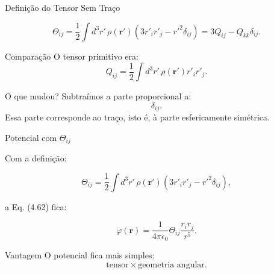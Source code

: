 \documentclass[aspectratio=169]{beamer}
\begin{document}
\begin{frame}{Definição do Tensor Sem Traço}

\begin{eqbox}
\begin{equation}
\Theta_{ij}
=
\frac12
\int d^3r'\,
\rho(\mathbf r')
\left(
3r'_i r'_j-r'^2\delta_{ij}
\right)
=
3Q_{ij}-Q_{kk}\delta_{ij}.
\tag{4.63}
\end{equation}
\end{eqbox}

\begin{mybox}{Comparação}
O tensor primitivo era:
\[
Q_{ij}
=
\frac12
\int d^3r'\,
\rho(\mathbf r')r'_i r'_j.
\]
\end{mybox}

\begin{alertblock}{O que mudou?}
Subtraímos a parte proporcional a:
\[
\delta_{ij}.
\]
Essa parte corresponde ao traço, isto é, à parte esfericamente simétrica.
\end{alertblock}

\end{frame}

\begin{frame}{Potencial com \(\Theta_{ij}\)}

Com a definição:

\[
\Theta_{ij}
=
\frac12
\int d^3r'\,
\rho(\mathbf r')
\left(
3r'_i r'_j-r'^2\delta_{ij}
\right),
\]

a Eq. (4.62) fica:

\begin{eqbox}
\begin{equation}
\varphi(\mathbf r)
=
\frac{1}{4\pi\epsilon_0}
\Theta_{ij}
\frac{r_i r_j}{r^5}.
\tag{4.64}
\end{equation}
\end{eqbox}

\begin{mybox}{Vantagem}
O potencial fica mais simples:
\[
\text{tensor}
\times
\text{geometria angular}.
\]
\end{mybox}
\end{frame}
\end{document}
